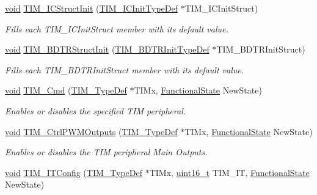 \begin{DoxyCompactItemize}
\hyperlink{usb__devapi_8h_afabf60e7f57651d6d595a02c75f07cd0}{void} \hyperlink{group___t_i_m___private___functions_ga5005dac8e4e8a4c7fc2a0ef05b77cc50}{T\+I\+M\+\_\+\+I\+C\+Struct\+Init} (\hyperlink{struct_t_i_m___i_c_init_type_def}{T\+I\+M\+\_\+\+I\+C\+Init\+Type\+Def} $\ast$T\+I\+M\+\_\+\+I\+C\+Init\+Struct)
\begin{DoxyCompactList}\small\item\em Fills each T\+I\+M\+\_\+\+I\+C\+Init\+Struct member with its default value. \end{DoxyCompactList}\item 
\hyperlink{usb__devapi_8h_afabf60e7f57651d6d595a02c75f07cd0}{void} \hyperlink{group___t_i_m___private___functions_gaea0f49938cda8ae0738162194798afc6}{T\+I\+M\+\_\+\+B\+D\+T\+R\+Struct\+Init} (\hyperlink{struct_t_i_m___b_d_t_r_init_type_def}{T\+I\+M\+\_\+\+B\+D\+T\+R\+Init\+Type\+Def} $\ast$T\+I\+M\+\_\+\+B\+D\+T\+R\+Init\+Struct)
\begin{DoxyCompactList}\small\item\em Fills each T\+I\+M\+\_\+\+B\+D\+T\+R\+Init\+Struct member with its default value. \end{DoxyCompactList}\item 
\hyperlink{usb__devapi_8h_afabf60e7f57651d6d595a02c75f07cd0}{void} \hyperlink{group___t_i_m___private___functions_ga2bdc275bcbd2ce9d1ba632e6c89896b7}{T\+I\+M\+\_\+\+Cmd} (\hyperlink{struct_t_i_m___type_def}{T\+I\+M\+\_\+\+Type\+Def} $\ast$T\+I\+Mx, \hyperlink{agilefox_2library_2inc_2stm32f10x__type_8h_ac9a7e9a35d2513ec15c3b537aaa4fba1}{Functional\+State} New\+State)
\begin{DoxyCompactList}\small\item\em Enables or disables the specified T\+IM peripheral. \end{DoxyCompactList}\item 
\hyperlink{usb__devapi_8h_afabf60e7f57651d6d595a02c75f07cd0}{void} \hyperlink{group___t_i_m___private___functions_ga3e59ebced2ab8e0b817c460f1670e97d}{T\+I\+M\+\_\+\+Ctrl\+P\+W\+M\+Outputs} (\hyperlink{struct_t_i_m___type_def}{T\+I\+M\+\_\+\+Type\+Def} $\ast$T\+I\+Mx, \hyperlink{agilefox_2library_2inc_2stm32f10x__type_8h_ac9a7e9a35d2513ec15c3b537aaa4fba1}{Functional\+State} New\+State)
\begin{DoxyCompactList}\small\item\em Enables or disables the T\+IM peripheral Main Outputs. \end{DoxyCompactList}\item 
\hyperlink{usb__devapi_8h_afabf60e7f57651d6d595a02c75f07cd0}{void} \hyperlink{group___t_i_m___private___functions_ga70e3d6c09d55ee69002e154c85cd40e4}{T\+I\+M\+\_\+\+I\+T\+Config} (\hyperlink{struct_t_i_m___type_def}{T\+I\+M\+\_\+\+Type\+Def} $\ast$T\+I\+Mx, \hyperlink{_p_e___types_8h_a1f1825b69244eb3ad2c7165ddc99c956}{uint16\+\_\+t} T\+I\+M\+\_\+\+IT, \hyperlink{agilefox_2library_2inc_2stm32f10x__type_8h_ac9a7e9a35d2513ec15c3b537aaa4fba1}{Functional\+State} New\+State)

\end{DoxyCompactItemize}
